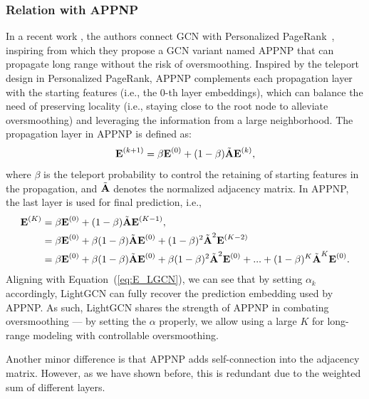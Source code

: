 \subsubsection{Relation with APPNP}\label{ss:APPNP} In a recent work \cite{ICLR19-APPNP}, the authors
connect GCN with Personalized PageRank~\cite{haveliwala2002topic}, inspiring from which they propose a GCN variant named APPNP that can propagate long range without the risk of oversmoothing. 
Inspired by the teleport design in Personalized PageRank, APPNP complements each propagation layer with the starting features (i.e., the 0-th layer embeddings), which can balance the need of preserving locality (i.e., staying close to the root node to alleviate oversmoothing) and leveraging the information from a large neighborhood. The propagation layer in APPNP is defined as:
\begin{equation}
    \textbf{E}^{(k+1)} = \beta \textbf{E}^{(0)} + (1-\beta) \Tilde{\textbf{A}} \textbf{E}^{(k)},
\end{equation}
where $\beta$ is the teleport probability to control the retaining of starting features in the propagation, and $\Tilde{\textbf{A}}$ denotes the normalized adjacency matrix. In APPNP, the last layer is used for final prediction, i.e., 
\begin{equation}
\begin{aligned}
    \textbf{E}^{(K)} &= \beta \textbf{E}^{(0)} + (1-\beta) \Tilde{\textbf{A}} \textbf{E}^{(K-1)}, \\
    &= \beta \textbf{E}^{(0)} + \beta (1-\beta) \Tilde{\textbf{A}} \textbf{E}^{(0)} + (1-\beta)^2 \Tilde{\textbf{A}}^2 \textbf{E}^{(K-2)} \\
    &= \beta \textbf{E}^{(0)} + \beta (1-\beta) \Tilde{\textbf{A}} \textbf{E}^{(0)} + \beta(1-\beta)^2 \Tilde{\textbf{A}}^2 \textbf{E}^{(0)} + ... + (1-\beta)^K \Tilde{\textbf{A}}^K \textbf{E}^{(0)}.
\end{aligned}
\end{equation}
Aligning with Equation~(\ref{eq:E_LGCN}), we can see that by setting $\alpha_k$ accordingly, LightGCN can fully recover the prediction embedding used by APPNP. 
As such, LightGCN shares the strength of APPNP in combating oversmoothing --- by setting the $\alpha$ properly, we allow using a large $K$ for long-range modeling with controllable oversmoothing. 

Another minor difference is that APPNP adds self-connection into the adjacency matrix. However, as we have shown before, this is redundant due to the weighted sum of different layers. 


